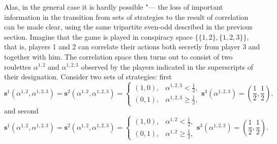 Alas, in the general case it is hardly possible "--- the loss of important information in the transition from sets of strategies to the result of correlation can be made clear, using the same tripartite even-odd described in the previous section. Imagine that the game is played in conspiracy space $\{\{1, 2\}, \{1, 2, 3\}\}$, that is, players 1 and 2 can correlate their actions both secretly from player 3 and together with him. The correlation space then turns out to consist of two roulettes $\alpha^{1, 2}$ and $\alpha^{1, 2, 3}$ observed by the players indicated in the superscripts of their designation. Consider two sets of strategies: first %
\begin{equation*}
	\mathbf{s}^1(\alpha^{1, 2}, \alpha^{1, 2, 3}) = \mathbf{s}^2(\alpha^{1, 2}, \alpha^{1, 2, 3}) = \begin{cases}
		(1, 0), & \alpha^{1, 2, 3} < \frac{1}{2},\\
		(0, 1), & \alpha^{1, 2, 3} \ge \frac{1}{2},
	\end{cases} \mathbf{s}^3(\alpha^{1, 2, 3}) = (\frac{1}{2}, \frac{1}{2}),
\end{equation*}
and second %
\begin{equation*}
	\mathbf{s}^1(\alpha^{1, 2}, \alpha^{1, 2, 3}) = \mathbf{s}^2(\alpha^{1, 2}, \alpha^{1, 2, 3}) = \begin{cases}
		(1, 0), & \alpha^{1, 2} < \frac{1}{2},\\
		(0, 1), & \alpha^{1, 2} \ge \frac{1}{2},
	\end{cases} \mathbf{s}^3(\alpha^{1, 2, 3}) = (\frac{1}{2}, \frac{1}{2}).
\end{equation*}

